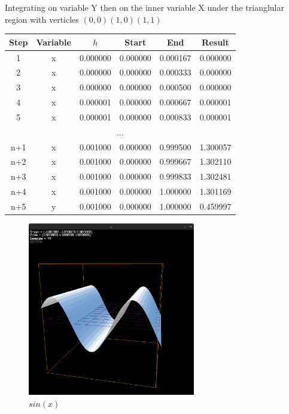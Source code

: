 \documentclass[12pt]{article}
\begin{document}
\begin{flushleft}
	Integrating on variable Y then on the inner variable X under the trianglular region with verticles $(0, 0) (1, 0) (1, 1)$
\end{flushleft}

\begin{table}[H]
	\centering
	\begin{tabular}{ | c c c c c c | }
		\hline
		\hline
		Step & Variable & $h$ & Start & End & Result \\
		\hline
		\hline
		1    & x & 0.000000 & 0.000000 & 0.000167 & 0.000000 \\
		\hline
		2    & x & 0.000000 & 0.000000 & 0.000333 & 0.000000 \\
		\hline
		3    & x & 0.000000 & 0.000000 & 0.000500 & 0.000000 \\
		\hline
		4    & x & 0.000001 & 0.000000 & 0.000667 & 0.000001 \\
		\hline
		5    & x & 0.000001 & 0.000000 & 0.000833 & 0.000001 \\
		\hline
		\multicolumn{6}{|c|}{...} \\
		\hline
		n+1  & x & 0.001000 & 0.000000 & 0.999500 & 1.300057 \\
		\hline
		n+2  & x & 0.001000 & 0.000000 & 0.999667 & 1.302110 \\
		\hline
		n+3  & x & 0.001000 & 0.000000 & 0.999833 & 1.302481 \\
		\hline
		n+4  & x & 0.001000 & 0.000000 & 1.000000 & 1.301169 \\
		\hline
		n+5  & y & 0.001000 & 0.000000 & 1.000000 & 0.459997 \\
		\hline
		\hline
	\end{tabular}
\end{table}

\begin{figure}
	\centering
	\includegraphics[width=0.65\textwidth]{example1.png}
	\caption{$sin(x)$}
	\label{fig:example1}
\end{figure}
\end{document}
